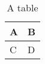 \begin{table}
\caption{A table}
\begin{tabular}{|l|l|}
\hline
A & B \\
\hline
C & D \\
\hline
\end{tabular}
\end{table}

